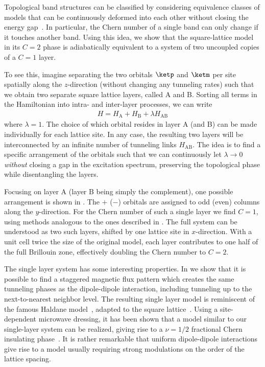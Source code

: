 Topological band structures can be classified by considering equivalence classes of models that can be continuously deformed into each other without closing the energy gap~\cite{Hasan2010}.
In particular, the Chern number of a single band can only change if it touches another band.
Using this idea, we show that the square-lattice model in its $C=2$ phase is adiabatically equivalent to a system of two uncoupled copies of a $C=1$ layer.

To see this, imagine separating the two orbitals $\ketp$ and $\ketm$ per site spatially along the $z$-direction (without changing any tunneling rates) such that we obtain two separate square lattice layers, called A and B\@.
Sorting all terms in the Hamiltonian into intra- and inter-layer processes, we can write
\begin{align}
H=H_\text{A} + H_\text{B} + \lambda H_\text{AB}
\end{align}
where $\lambda=1$.
The choice of which orbital resides in layer A (and B) can be made individually for each lattice site.
In any case, the resulting two layers will be interconnected by an infinite number of tunneling links $H_\text{AB}$.
The idea is to find a specific arrangement of the orbitals such that we can continuously let $\lambda \longrightarrow 0$ \emph{without} closing a gap in the excitation spectrum, preserving the topological phase while disentangling the layers.

Focusing on layer A (layer B being simply the complement), one possible arrangement is shown in .
The ${+}$ (${-}$) orbitals are assigned to odd (even) columns along the $y$-direction.
For the Chern number of such a single layer we find $C=1$, using methods analogous to the ones described in .
The full system can be understood as two such layers, shifted by one lattice site in $x$-direction.
With a unit cell twice the size of the original model, each layer contributes to one half of the full Brillouin zone, effectively doubling the Chern number to $C=2$.

The single layer system has some interesting properties.
In  we show that it is possible to find a staggered magnetic flux pattern which creates the same tunneling phases as the dipole-dipole interaction, including tunneling up to the next-to-nearest neighbor level.
The resulting single layer model is reminiscent of the famous Haldane model~\cite{Haldane1988}, adapted to the square lattice~\cite{Goldman2013,Li2008,Liu2010,Liu2011,Stanescu2010,Wang2011,Wang2014,Yao2012,Yao2013}.
Using a site-dependent microwave dressing, it has been shown that a model similar to our single-layer system can be realized, giving rise to a $\nu=1/2$ fractional Chern insulating phase~\cite{Yao2012,Yao2013}.
It is rather remarkable that uniform dipole-dipole interactions give rise to a model usually requiring strong modulations on the order of the lattice spacing.

